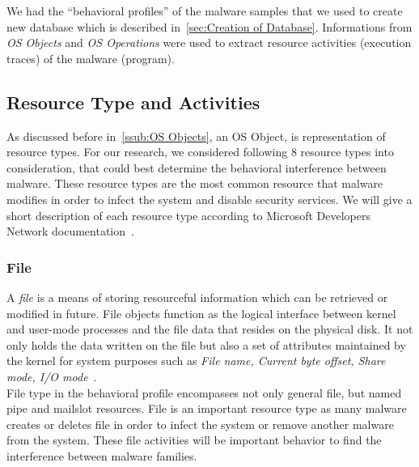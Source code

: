 We had the ``behavioral profiles'' of the malware samples that we used to create new database which is described in~\autoref{sec:Creation of Database}.
Informations from \emph{OS Objects} and \emph{OS Operations} were used to extract resource activities (execution traces) of the malware (program).

\subsection{Resource Type and Activities}
\label{sub:Resource Types and Activities}
As discussed before in~\autoref{ssub:OS Objects}, an OS Object, is representation of resource types.
For our research, we considered following 8 resource types into consideration, that could best determine the behavioral interference between malware.
These resource types are the most common resource that malware modifies in order to infect the system and disable security services.
We will give a short description of each resource type according to Microsoft Developers Network documentation~\cite[MSDN]{msdn}.
\subsubsection{File}
\label{ssub:File}
A \emph{file} is a means of storing resourceful information which can be retrieved or modified in future.
File objects function as the logical interface between kernel and user-mode processes and the file data that resides on the physical disk.
It not only holds the data written on the file but also a set of attributes maintained by the kernel for system purposes such as \emph{File name, Current byte offset, Share mode, I/O mode}~\cite[]{msfile}.\\
File type in the behavioral profile encompasses not only general file, but named pipe and mailslot resources.
File is an important resource type as many malware creates or deletes file in order to infect the system or remove another malware from the system.
These file activities will be important behavior to find the interference between malware families.
